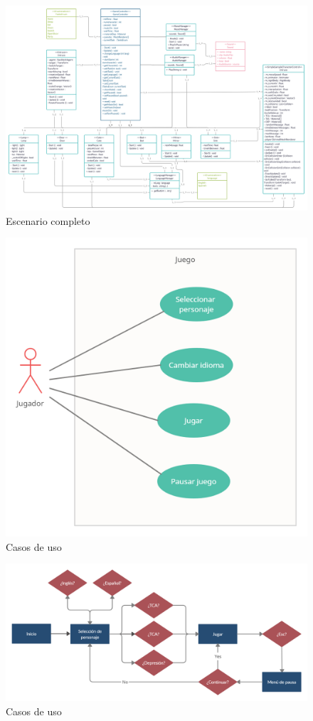 \documentclass[12pt, a4paper,twoside,titlepage]{book}
\begin{document}
\begin{landscape}
\begin{figure}
    \centering
    \includegraphics[width=1\linewidth]{TGF/Extra/UML.png}
    \caption{Escenario completo}
    \label{fig:UML}
\end{figure}
\end{landscape}


\begin{figure}
	\centering
	\includegraphics[width=.6\linewidth]{TGF/Extra/Casos de uso.png}
	\caption{Casos de uso}
	\label{fig:casosuso}
\end{figure}

\begin{landscape}
\begin{figure}
	\centering
	\includegraphics[width=.8\linewidth]{TGF/Extra/Flow.png}
	\caption{Casos de uso}
	\label{fig:diagramaflujo}
\end{figure}
\end{landscape}
\end{document}
